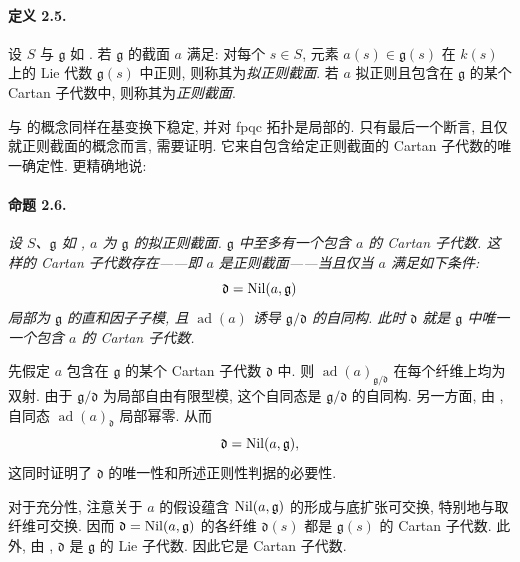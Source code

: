 \paragraph{\textbf{定义 2.5.}}
设 \(S\) 与 \(\mathfrak g\) 如 . 若 \(\mathfrak g\) 的截面 \(a\) 满足: 对每个 \(s\in S\), 元素 \(a(s)\in\mathfrak g(s)\) 在 \(k(s)\) 上的 Lie 代数 \(\mathfrak g(s)\) 中正则, 则称其为\emph{拟正则截面}. 若 \(a\) 拟正则且包含在 \(\mathfrak g\) 的某个 Cartan 子代数中, 则称其为\emph{正则截面}.

 与  的概念同样在基变换下稳定, 并对 fpqc 拓扑是局部的. 只有最后一个断言, 且仅就正则截面的概念而言, 需要证明. 它来自包含给定正则截面的 Cartan 子代数的唯一确定性. 更精确地说:



\paragraph{\textbf{命题 2.6.}}
\emph{设 \(S\)、\(\mathfrak g\) 如 , \(a\) 为 \(\mathfrak g\) 的拟正则截面. \(\mathfrak g\) 中至多有一个包含 \(a\) 的 Cartan 子代数. 这样的 Cartan 子代数存在——即 \(a\) 是正则截面——当且仅当 \(a\) 满足如下条件:
\[
  \mathfrak d=\operatorname{Nil}(a,\mathfrak g)
\]
局部为 \(\mathfrak g\) 的直和因子子模, 且 \(\operatorname{ad}(a)\) 诱导 \(\mathfrak g/\mathfrak d\) 的自同构. 此时 \(\mathfrak d\) 就是 \(\mathfrak g\) 中唯一一个包含 \(a\) 的 Cartan 子代数.}

先假定 \(a\) 包含在 \(\mathfrak g\) 的某个 Cartan 子代数 \(\mathfrak d\) 中. 则 \(\operatorname{ad}(a)_{\mathfrak g/\mathfrak d}\) 在每个纤维上均为双射. 由于 \(\mathfrak g/\mathfrak d\) 为局部自由有限型模, 这个自同态是 \(\mathfrak g/\mathfrak d\) 的自同构. 另一方面, 由 , 自同态 \(\operatorname{ad}(a)_{\mathfrak d}\) 局部幂零. 从而
\[
  \mathfrak d=\operatorname{Nil}(a,\mathfrak g),
\]
这同时证明了 \(\mathfrak d\) 的唯一性和所述正则性判据的必要性.

对于充分性, 注意关于 \(a\) 的假设蕴含 \(\operatorname{Nil}(a,\mathfrak g)\) 的形成与底扩张可交换, 特别地与取纤维可交换. 因而 \(\mathfrak d=\operatorname{Nil}(a,\mathfrak g)\) 的各纤维 \(\mathfrak d(s)\) 都是 \(\mathfrak g(s)\) 的 Cartan 子代数. 此外, 由 , \(\mathfrak d\) 是 \(\mathfrak g\) 的 Lie 子代数. 因此它是 Cartan 子代数.

